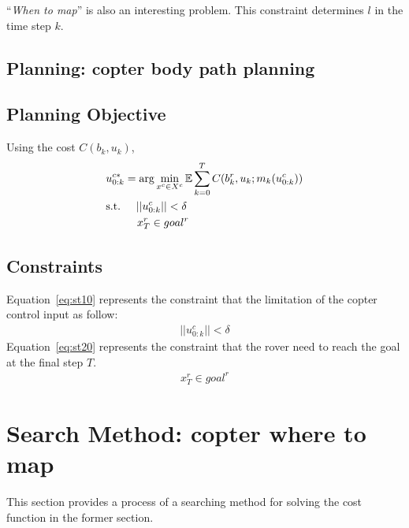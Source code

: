 \documentclass[conference]{IEEEtran}
\begin{document}
``{\it When to map}'' is also an interesting problem. This constraint determines $l$ in the time step $k$.
\textcolor[gray]{0.5}{
\section{Planning: copter body path planning}
\subsection{Planning Objective}
Using the cost $C(b_k, u_k)$,
\begin{align}
    &u^{c*}_{0:k}=\arg\min_{x^c \in X^c} \mathbb{E} \sum^T_{k=0} C(b^r_k, u_k; m_k (u^c_{0:k}))\\
    &{\rm s.t.} \hspace{5mm} ||u^c_{0:k}||< \delta\label{eq:st10}\\
    &\hspace{10mm} x^r_T \in goal^r\label{eq:st20}
\end{align}
}
\textcolor[gray]{0.5}{
\subsection{Constraints}
Equation~\eqref{eq:st10} represents the constraint that the limitation of the copter control input as follow:
\begin{align}
    ||u^c_{0:k}||< \delta
\end{align}
Equation~\eqref{eq:st20} represents the constraint that the rover need to reach the goal at the final step $T$.
\begin{align}
    x^r_T \in goal^r
\end{align}
}
\section{Search Method: copter where to map}
This section provides a process of a searching method for solving the cost function in the former section.
\end{document}
